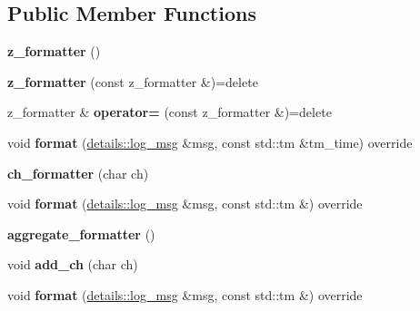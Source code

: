 \subsection*{Public Member Functions}
\begin{DoxyCompactItemize}
\item 
{\bfseries z\+\_\+formatter} ()\hypertarget{classspdlog_1_1details_1_1SPDLOG__FINAL_a978faf456694793a6dba7dc1a521afcc}{}\label{classspdlog_1_1details_1_1SPDLOG__FINAL_a978faf456694793a6dba7dc1a521afcc}

\item 
{\bfseries z\+\_\+formatter} (const z\+\_\+formatter \&)=delete\hypertarget{classspdlog_1_1details_1_1SPDLOG__FINAL_aeaf6875bb0429c5bd553d8738f5a60d2}{}\label{classspdlog_1_1details_1_1SPDLOG__FINAL_aeaf6875bb0429c5bd553d8738f5a60d2}

\item 
z\+\_\+formatter \& {\bfseries operator=} (const z\+\_\+formatter \&)=delete\hypertarget{classspdlog_1_1details_1_1SPDLOG__FINAL_a6916b6e34dcf4aaac5e7170694969235}{}\label{classspdlog_1_1details_1_1SPDLOG__FINAL_a6916b6e34dcf4aaac5e7170694969235}

\item 
void {\bfseries format} (\hyperlink{structspdlog_1_1details_1_1log__msg}{details\+::log\+\_\+msg} \&msg, const std\+::tm \&tm\+\_\+time) override\hypertarget{classspdlog_1_1details_1_1SPDLOG__FINAL_a6e85e7bdc2848696747027f0e21c2aed}{}\label{classspdlog_1_1details_1_1SPDLOG__FINAL_a6e85e7bdc2848696747027f0e21c2aed}

\item 
{\bfseries ch\+\_\+formatter} (char ch)\hypertarget{classspdlog_1_1details_1_1SPDLOG__FINAL_ad499c841486142b364cfa088f260cc94}{}\label{classspdlog_1_1details_1_1SPDLOG__FINAL_ad499c841486142b364cfa088f260cc94}

\item 
void {\bfseries format} (\hyperlink{structspdlog_1_1details_1_1log__msg}{details\+::log\+\_\+msg} \&msg, const std\+::tm \&) override\hypertarget{classspdlog_1_1details_1_1SPDLOG__FINAL_adbbdb85a8f45fd0301f3f68bbbbe1647}{}\label{classspdlog_1_1details_1_1SPDLOG__FINAL_adbbdb85a8f45fd0301f3f68bbbbe1647}

\item 
{\bfseries aggregate\+\_\+formatter} ()\hypertarget{classspdlog_1_1details_1_1SPDLOG__FINAL_a3c7cca3c266aa8cab24995895b3beec7}{}\label{classspdlog_1_1details_1_1SPDLOG__FINAL_a3c7cca3c266aa8cab24995895b3beec7}

\item 
void {\bfseries add\+\_\+ch} (char ch)\hypertarget{classspdlog_1_1details_1_1SPDLOG__FINAL_ad1b7c4d4de7eae2262ef580e048da163}{}\label{classspdlog_1_1details_1_1SPDLOG__FINAL_ad1b7c4d4de7eae2262ef580e048da163}

\item 
void {\bfseries format} (\hyperlink{structspdlog_1_1details_1_1log__msg}{details\+::log\+\_\+msg} \&msg, const std\+::tm \&) override\hypertarget{classspdlog_1_1details_1_1SPDLOG__FINAL_adbbdb85a8f45fd0301f3f68bbbbe1647}{}\label{classspdlog_1_1details_1_1SPDLOG__FINAL_adbbdb85a8f45fd0301f3f68bbbbe1647}

\end{DoxyCompactItemize}
